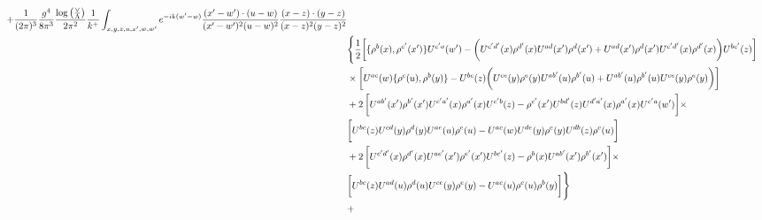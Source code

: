 \documentclass[aps,prd,amsmath,amssymb,nofootinbib]{revtex4-2}
\numberwithin{equation}{section}
\begin{document}
\begin{align}
    + \frac{1}{(2\pi)^{3}}\frac{g^{4}}{8\pi^{3}}\frac{\log{\left(\frac{\vee}{\Lambda}\right)}}{2\pi^{2}} \frac{1}{k^{+}}\int_{x,y,z,u,x^{\prime},w,w^{\prime}}e^{-ik(w^{\prime}-w)}\frac{(x^{\prime}-w^{\prime})\cdot (u-w)}{(x^{\prime}-w^{\prime})^{2} (u-w)^{2}} \frac{(x-z)\cdot (y-z)}{(x-z)^{2}(y-z)^{2}}\notag \\ & \Bigg\{\frac{1}{2}\bigg[\{\rho^{b}(x),\rho^{c^{\prime}}(x^{\prime})\}U^{c^{\prime}a}(w^{\prime})-\bigg(U^{c^{\prime}d^{\prime}}(x)\rho^{d^{\prime}}(x)U^{ad}(x^{\prime})\rho^{d}(x^{\prime})+U^{ad}(x^{\prime})\rho^{d}(x^{\prime})U^{c^{\prime}d^{\prime}}(x)\rho^{d^{\prime}}(x)\bigg)U^{bc^{\prime}}(z)\bigg]\notag \\ & \times\bigg[U^{ac}(w)\{\rho^{c}(u),\rho^{b}(y)\}-U^{bc}(z)\bigg(U^{ce}(y)\rho^{e}(y)U^{ab^{\prime}}(u)\rho^{b^{\prime}}(u)+U^{ab^{\prime}}(u)\rho^{b^{\prime}}(u)U^{ce}(y)\rho^{e}(y)\bigg)\bigg]\notag \\ & +2\, \bigg[U^{ab^{\prime}}(x^{\prime})\rho^{b^{\prime}}(x^{\prime})U^{c^{\prime}a^{\prime}}(x)\rho^{a^{\prime}}(x)U^{c^{\prime}b}(z)-\rho^{c^{\prime}}(x^{\prime})U^{bd^{\prime}}(z)U^{d^{\prime}a^{\prime}}(x)\rho^{a^{\prime}}(x)U^{c^{\prime}a}(w^{\prime})\bigg]\times\notag \\ &  \bigg[U^{bc}(z)U^{cd}(y)\rho^{d}(y)U^{ae}(u)\rho^{e}(u)-U^{ac}(w)U^{de}(y)\rho^{e}(y)U^{db}(z)\rho^{c}(u)\bigg]\notag \\ & +2\, \bigg[U^{c^{\prime}d^{\prime}}(x)\rho^{d^{\prime}}(x)U^{ae^{\prime}}(x^{\prime})\rho^{e^{\prime}}(x^{\prime})U^{bc^{\prime}}(z)-\rho^{b}(x)U^{ab^{\prime}}(x^{\prime})\rho^{b^{\prime}}(x^{\prime})\bigg]\times\notag \\ &  \bigg[U^{bc}(z)U^{ad}(u)\rho^{d}(u)U^{ce}(y)\rho^{e}(y)-U^{ac}(u)\rho^{c}(u)\rho^{b}(y)\bigg] \Bigg\}\notag \\ & +

\end{align}
\end{document}
